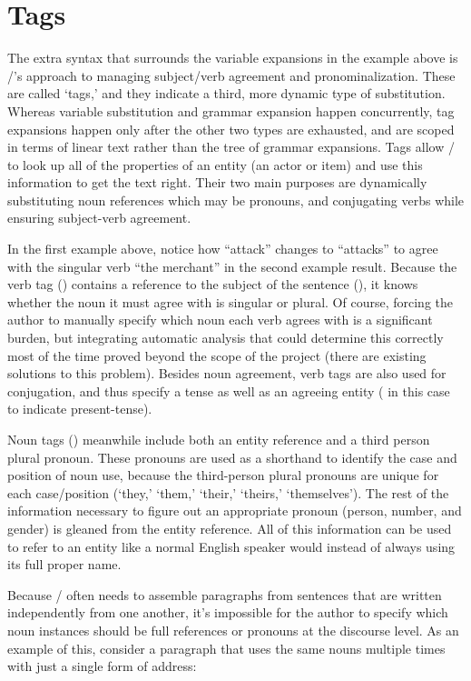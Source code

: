 \section{Tags}

The extra syntax that surrounds the variable expansions in the  example above is \dunyazad/'s approach to managing subject/verb agreement and pronominalization.
%
These are called `tags,' and they indicate a third, more dynamic type of substitution.
%
Whereas variable substitution and grammar expansion happen concurrently, tag expansions happen only after the other two types are exhausted, and are scoped in terms of linear text rather than the tree of grammar expansions.
%
Tags allow \dunyazad/ to look up all of the properties of an entity (an actor or item) and use this information to get the text right.
%
Their two main purposes are dynamically substituting noun references which may be pronouns, and conjugating verbs while ensuring subject-verb agreement.


In the first example above, notice how ``attack'' changes to ``attacks'' to agree with the singular verb ``the merchant'' in the second example result.
%
Because the verb tag () contains a reference to the subject of the sentence (), it knows whether the noun it must agree with is singular or plural.
%
Of course, forcing the author to manually specify which noun each verb agrees with is a significant burden, but integrating automatic analysis that could determine this correctly most of the time proved beyond the scope of the project (there are existing solutions to this problem).
%
Besides noun agreement, verb tags are also used for conjugation, and thus specify a tense as well as an agreeing entity ( in this case to indicate present-tense).


Noun tags () meanwhile include both an entity reference and a third person plural pronoun.
%
These pronouns are used as a shorthand to identify the case and position of noun use, because the third-person plural pronouns are unique for each case/position (`they,' `them,' `their,' `theirs,' `themselves').
%
The rest of the information necessary to figure out an appropriate pronoun (person, number, and gender) is gleaned from the entity reference.
%
All of this information can be used to refer to an entity like a normal English speaker would instead of always using its full proper name.


Because \dunyazad/ often needs to assemble paragraphs from sentences that are written independently from one another, it's impossible for the author to specify which noun instances should be full references or pronouns at the discourse level.
%
As an example of this, consider a paragraph that uses the same nouns multiple times with just a single form of address:

